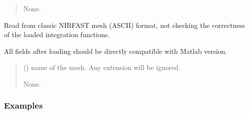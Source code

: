 \documentclass[letterpaper,10pt,english]{sphinxmanual}
\begin{document}
\begin{fulllineitems}
\begin{fulllineitems}
\begin{quote}
\begin{description}
\sphinxAtStartPar
None.

\end{description}\end{quote}

\end{fulllineitems}


\begin{fulllineitems}
\label{\detokenize{_autosummary/nirfasterff.base.stnd_mesh.stndmesh:nirfasterff.base.stnd_mesh.stndmesh.from_file}}
\pysigstartsignatures
{}
\pysigstopsignatures
\sphinxAtStartPar
Read from classic NIRFAST mesh (ASCII) format, not checking the correctness of the loaded integration functions.

\sphinxAtStartPar
All fields after loading should be directly compatible with Matlab version.
\begin{quote}\begin{description}
\sphinxAtStartPar
{} () \textendash{} name of the mesh. Any extension will be ignored.

\sphinxAtStartPar
None.

\end{description}\end{quote}
\subsubsection*{Examples}

\begin{sphinxVerbatim}[commandchars=\\\{\}]
  
\end{sphinxVerbatim}

\end{fulllineitems}



\end{fulllineitems}
\end{document}
